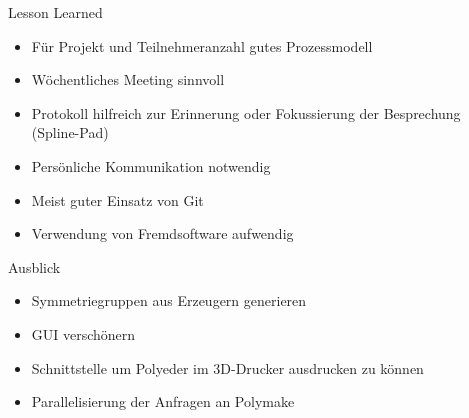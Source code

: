 \documentclass[ucs,11pt]{beamer}
\begin{document}
\begin{frame}{Lesson Learned}
	\begin{itemize}
		\item Für Projekt und Teilnehmeranzahl gutes Prozessmodell \pause
		\item Wöchentliches Meeting sinnvoll \pause
		\item Protokoll hilfreich zur Erinnerung oder Fokussierung der Besprechung (Spline-Pad) \pause
		\item Persönliche Kommunikation notwendig \pause
		\item Meist guter Einsatz von Git \pause
		\item Verwendung von Fremdsoftware aufwendig \pause
	\end{itemize}
\end{frame}

\begin{frame}{Ausblick}
\begin{itemize}
	\item Symmetriegruppen aus Erzeugern generieren
	\item GUI verschönern
	\item Schnittstelle um Polyeder im 3D-Drucker ausdrucken zu können
	\item Parallelisierung der Anfragen an Polymake
\end{itemize}
\end{frame}
\end{document}
